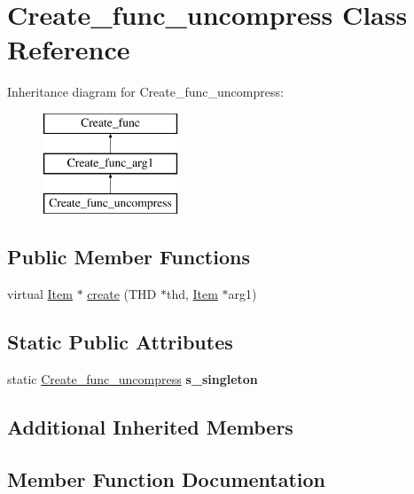 \hypertarget{classCreate__func__uncompress}{}\section{Create\+\_\+func\+\_\+uncompress Class Reference}
\label{classCreate__func__uncompress}
Inheritance diagram for Create\+\_\+func\+\_\+uncompress\+:\begin{figure}[H]
\begin{center}
\leavevmode
\includegraphics[height=3.000000cm]{classCreate__func__uncompress}
\end{center}
\end{figure}
\subsection*{Public Member Functions}
\begin{DoxyCompactItemize}
\item 
virtual \mbox{\hyperlink{classItem}{Item}} $\ast$ \mbox{\hyperlink{classCreate__func__uncompress_a0fbbf7376c72bce61d3264c0ee661890}{create}} (T\+HD $\ast$thd, \mbox{\hyperlink{classItem}{Item}} $\ast$arg1)
\end{DoxyCompactItemize}
\subsection*{Static Public Attributes}
\begin{DoxyCompactItemize}
\item 
\mbox{\label{classCreate__func__uncompress_aa0ea6b03190880fa46e6de7877761d56}} 
static \mbox{\hyperlink{classCreate__func__uncompress}{Create\+\_\+func\+\_\+uncompress}} {\bfseries s\+\_\+singleton}
\end{DoxyCompactItemize}
\subsection*{Additional Inherited Members}


\subsection{Member Function Documentation}
\mbox{\label{classCreate__func__uncompress_a0fbbf7376c72bce61d3264c0ee661890}} 
